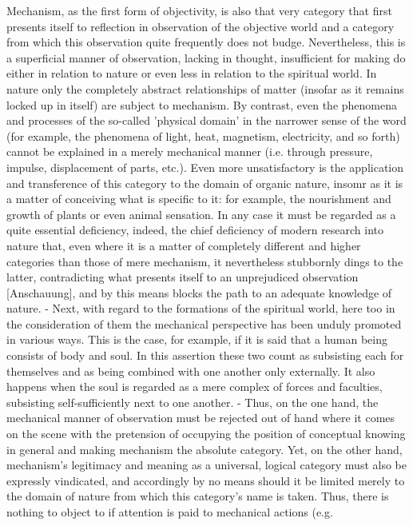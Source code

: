 Mechanism, as the first form of objectivity, is also that very category
that first presents itself to reflection in observation of the objective
world and a category from which this observation quite frequently does not budge.
Nevertheless, this is a superficial manner of observation, lacking in thought,
insufficient for making do either in relation to nature or even less in relation
to the spiritual world. In nature only the completely abstract relationships of
matter (insofar as it remains locked up in itself) are subject to mechanism. By
contrast, even the phenomena and processes of the so-called 'physical domain'
in the narrower sense of the word (for example, the phenomena of light, heat,
magnetism, electricity, and so forth) cannot be explained in a merely mechanical
manner (i.e. through pressure, impulse, displacement of parts, etc.). Even more
unsatisfactory is the application and transference of this category to the domain
of organic nature, insomr as it is a matter of conceiving what is specific to it:
for example, the nourishment and growth of plants or even animal sensation.
In any case it must be regarded as a quite essential deficiency, indeed, the chief
deficiency of modern research into nature that, even where it is a matter of
completely different and higher categories than those of mere mechanism, it
nevertheless stubbornly dings to the latter, contradicting what presents itself to
an unprejudiced observation [Anschauung], and by this means blocks the path to
an adequate knowledge of nature. - Next, with regard to the formations of the
spiritual world, here too in the consideration of them the mechanical perspective
has been unduly promoted in various ways. This is the case, for example, if it is
said that a human being consists of body and soul. In this assertion these two count
as subsisting each for themselves and as being combined with one another only
externally. It also happens when the soul is regarded as a mere complex of forces
and faculties, subsisting self-sufficiently next to one another. - Thus, on the one
hand, the mechanical manner of observation must be rejected out of hand where
it comes on the scene with the pretension of occupying the position of conceptual
knowing in general and making mechanism the absolute category. Yet, on the
other hand, mechanism's legitimacy and meaning as a universal, logical category
must also be expressly vindicated, and accordingly by no means should it be
limited merely to the domain of nature from which this category's name is taken.
Thus, there is nothing to object to if attention is paid to mechanical actions (e.g.
